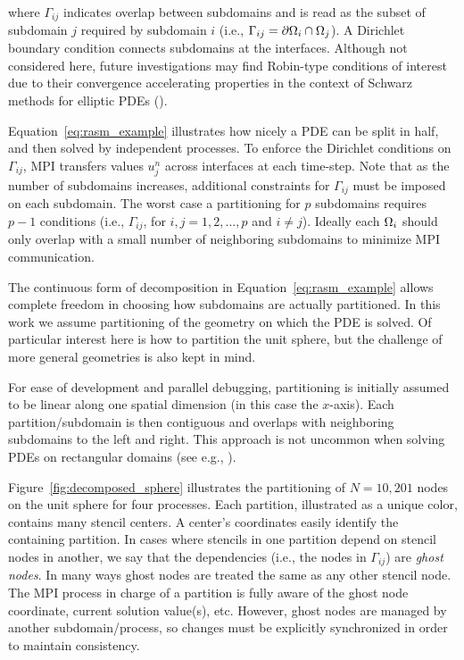 \documentclass{report}
\begin{document}
\noindent where $\Gamma_{ij}$ indicates overlap between subdomains and is read as the subset of subdomain $j$ required by subdomain $i$ (i.e., $\Gamma_{ij} = \partial \Omega_i \cap \Omega_j$). A Dirichlet boundary condition connects subdomains at the interfaces. Although not considered here, future investigations may find Robin-type conditions of interest due to their convergence accelerating properties in the context of Schwarz methods for elliptic PDEs (\cite{StCyr2007}). 

Equation~\ref{eq:rasm_example} illustrates how nicely a PDE can be split in half, and then solved by independent processes. To enforce the Dirichlet conditions on $\Gamma_{ij}$, MPI transfers values $u_j^{n}$ across interfaces at each time-step. Note that as the number of subdomains increases, additional constraints for $\Gamma_{ij}$ must be imposed on each subdomain. The worst case a partitioning for $p$ subdomains requires $p-1$ conditions (i.e., $\Gamma_{ij}$, for $i,j=1,2,...,p$ and $i \neq j$). Ideally each $\Omega_i$ should only overlap with a small number of neighboring subdomains to minimize MPI communication. 


The continuous form of decomposition in Equation~\ref{eq:rasm_example} allows complete freedom in choosing how subdomains are actually partitioned. In this work we assume partitioning of the geometry on which the PDE is solved. Of particular interest here is how to partition the unit sphere, but the challenge of more general geometries is also kept in mind. 

For ease of development and parallel debugging, partitioning is initially
assumed to be linear along one spatial dimension (in this case the $x$-axis). Each partition/subdomain is then contiguous and overlaps with neighboring subdomains to the left and right. This approach is not uncommon when solving PDEs on rectangular domains (see e.g., \cite{Divo2007, Thibault2009}). 


Figure~\ref{fig:decomposed_sphere} illustrates the partitioning of
$N=10,201$ nodes on the unit sphere for four processes. 
Each partition, illustrated as a unique color, contains many stencil centers.  
A center's coordinates easily identify the containing partition. In cases where stencils in one partition depend on stencil nodes in another, we say that the dependencies (i.e., the nodes in $\Gamma_{ij}$) are \emph{ghost nodes}. 
In many ways ghost nodes are treated the same as any other stencil node. The MPI process in charge of a partition is fully aware of the ghost node coordinate, current solution value(s), etc. However, ghost nodes are managed by another subdomain/process, so changes must be explicitly synchronized in order to maintain consistency. 
\end{document}
